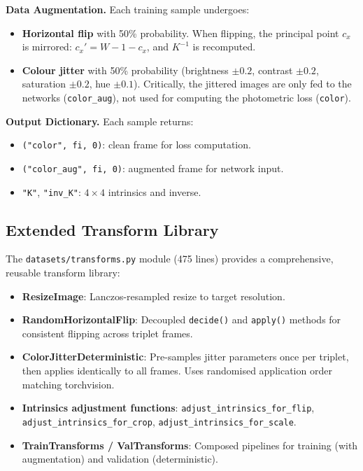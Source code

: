 \documentclass[10pt, a4paper, twocolumn]{article}
\begin{document}
\textbf{Data Augmentation.} Each training sample undergoes:
\begin{itemize}[noitemsep]
    \item \textbf{Horizontal flip} with 50\% probability. When flipping, the principal point $c_x$ is mirrored: $c_x' = W - 1 - c_x$, and $K^{-1}$ is recomputed.
    \item \textbf{Colour jitter} with 50\% probability (brightness $\pm 0.2$, contrast $\pm 0.2$, saturation $\pm 0.2$, hue $\pm 0.1$). Critically, the jittered images are only fed to the networks (\texttt{color\_aug}), not used for computing the photometric loss (\texttt{color}).
\end{itemize}

\textbf{Output Dictionary.} Each sample returns:
\begin{itemize}[noitemsep]
    \item \texttt{("color", fi, 0)}: clean frame for loss computation.
    \item \texttt{("color\_aug", fi, 0)}: augmented frame for network input.
    \item \texttt{"K"}, \texttt{"inv\_K"}: $4\times 4$ intrinsics and inverse.
\end{itemize}

\subsection{Extended Transform Library}

The \texttt{datasets/transforms.py} module (475 lines) provides a comprehensive, reusable transform library:

\begin{itemize}[noitemsep]
    \item \textbf{ResizeImage}: Lanczos-resampled resize to target resolution.
    \item \textbf{RandomHorizontalFlip}: Decoupled \texttt{decide()} and \texttt{apply()} methods for consistent flipping across triplet frames.
    \item \textbf{ColorJitterDeterministic}: Pre-samples jitter parameters once per triplet, then applies identically to all frames. Uses randomised application order matching torchvision.
    \item \textbf{Intrinsics adjustment functions}: \texttt{adjust\_intrinsics\_for\_flip}, \texttt{adjust\_intrinsics\_for\_crop}, \texttt{adjust\_intrinsics\_for\_scale}.
    \item \textbf{TrainTransforms / ValTransforms}: Composed pipelines for training (with augmentation) and validation (deterministic).
\end{itemize}
\end{document}
